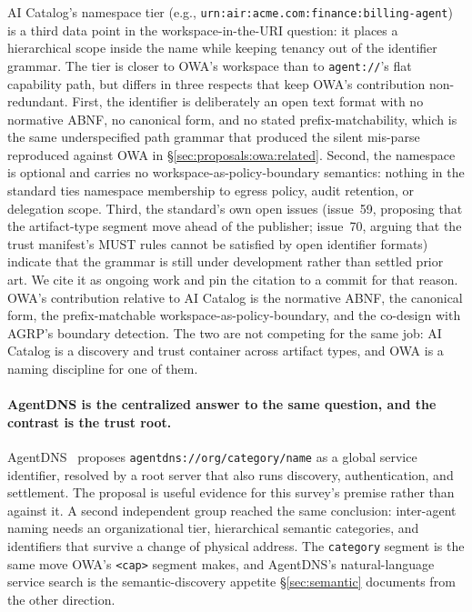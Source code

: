 AI Catalog's namespace tier (e.g.,
\texttt{urn:air:acme.com:finance:billing-agent}) is a
third data point in the workspace-in-the-URI question: it
places a hierarchical scope inside the name while keeping
tenancy out of the identifier grammar. The tier is closer
to OWA's workspace than to \texttt{agent://}'s flat
capability path, but differs in three respects that keep
OWA's contribution non-redundant. First, the identifier is
deliberately an open text format with no normative ABNF, no
canonical form, and no stated prefix-matchability, which is
the same underspecified path grammar that produced the
silent mis-parse reproduced against OWA in
\S\ref{sec:proposals:owa:related}. Second, the namespace is
optional and carries no workspace-as-policy-boundary
semantics: nothing in the standard ties namespace membership
to egress policy, audit retention, or delegation scope.
Third, the standard's own open issues (issue~59,
proposing that the artifact-type segment move ahead of the
publisher; issue~70, arguing that the trust manifest's MUST
rules cannot be satisfied by open identifier formats)
indicate that the grammar is still under development rather
than settled prior art. We cite it as ongoing work and pin
the citation to a commit for that reason. OWA's
contribution relative to AI Catalog is the normative ABNF,
the canonical form, the prefix-matchable
workspace-as-policy-boundary, and the co-design with AGRP's
boundary detection. The two are not competing for the same
job: AI Catalog is a discovery and trust container across
artifact types, and OWA is a naming discipline for one of
them.

\paragraph{AgentDNS is the centralized answer to the same
question, and the contrast is the trust root.}
AgentDNS~\cite{agentdns} proposes
\texttt{agentdns://org/category/name} as a global service
identifier, resolved by a root server that also runs
discovery, authentication, and settlement. The proposal is
useful evidence for this survey's premise rather than
against it. A second independent group reached the same
conclusion: inter-agent naming needs an organizational
tier, hierarchical semantic categories, and identifiers that
survive a change of physical address. The
\texttt{category} segment is the same move OWA's
\texttt{<cap>} segment makes, and AgentDNS's natural-language
service search is the semantic-discovery appetite
\S\ref{sec:semantic} documents from the other direction.

